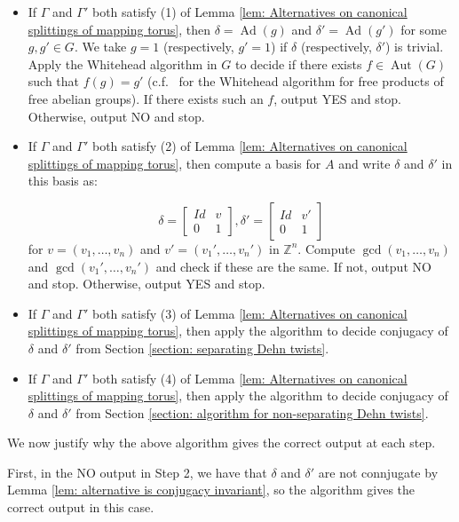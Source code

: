 \documentclass{amsart}
\newcommand{\Z}{\mathbb{Z}}
\DeclareMathOperator{\Aut}{Aut}
\DeclareMathOperator{\Ad}{Ad}
\theoremstyle{plain}
\theoremstyle{definition}
\theoremstyle{remark}
\begin{document}
\begin{itemize}
    \item If $\Gamma$ and $\Gamma'$ both satisfy (1) of Lemma \ref{lem: Alternatives on canonical splittings of mapping torus}, then $\delta = \Ad(g)$ and $\delta' = \Ad(g')$ for some $g,g' \in G$. We take $g = 1$ (respectively, $g' = 1$) if $\delta$ (respectively, $\delta'$) is trivial. Apply the Whitehead algorithm in $G$ to decide if there exists $f \in \Aut(G)$ such that $f(g) = g'$ (c.f.\ \cite{Whitehead_for_toral_relatively_hyperbolic_groups} for the Whitehead algorithm for free products of free abelian groups). If there exists such an $f$, output YES and stop. Otherwise, output NO and stop. 
    \item If $\Gamma$ and $\Gamma'$ both satisfy (2) of Lemma \ref{lem: Alternatives on canonical splittings of mapping torus}, then compute a basis for $A$ and write $\delta$ and $\delta'$ in this basis as:

    $$\delta = \begin{bmatrix}
        Id & v \\
        0 & 1
    \end{bmatrix}, \delta' = \begin{bmatrix}
        Id & v' \\
        0 & 1
    \end{bmatrix}$$
    for $v = (v_1,\ldots,v_n)$ and $v'=(v_1',\ldots,v_n')$ in $\Z^n$. Compute $\gcd(v_1,\ldots,v_n)$ and $\gcd(v_1',\ldots,v_n')$ and check if these are the same. If not, output NO and stop. Otherwise, output YES and stop.
    \item If $\Gamma$ and $\Gamma'$ both satisfy (3) of Lemma \ref{lem: Alternatives on canonical splittings of mapping torus}, then apply the algorithm to decide conjugacy of $\delta$ and $\delta'$ from Section \ref{section: separating Dehn twists}.
    \item If $\Gamma$ and $\Gamma'$ both satisfy (4) of Lemma \ref{lem: Alternatives on canonical splittings of mapping torus}, then apply the algorithm to decide conjugacy of $\delta$ and $\delta'$ from Section \ref{section: algorithm for non-separating Dehn twists}.
\end{itemize}

We now justify why the above algorithm gives the correct output at each step. 

First, in the NO output in Step 2, we have that $\delta$ and $\delta'$ are not connjugate by Lemma \ref{lem: alternative is conjugacy invariant}, so the algorithm gives the correct output in this case. 
\end{document}
